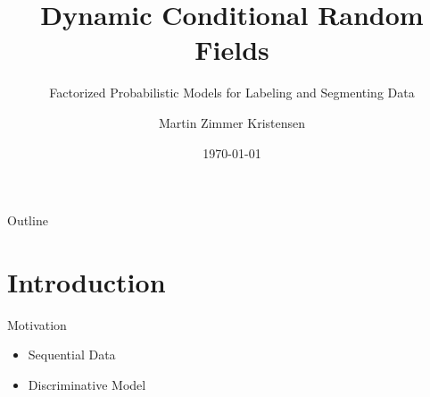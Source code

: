 \documentclass[presentation,bigger]{beamer}
\author{Martin Zimmer Kristensen}
\date{\today}
\title{Dynamic Conditional Random Fields}
\subtitle{Factorized Probabilistic Models for Labeling and Segmenting Data}
\begin{document}
\maketitle
\begin{frame}{Outline}
\setcounter{tocdepth}{1}
\tableofcontents
\end{frame}

\section{Introduction}
\label{sec:orgheadline10}
\begin{frame}[label={sec:orgheadline1}]{Motivation}
\begin{itemize}
\item Sequential Data
\item Discriminative Model
\end{itemize}
\end{frame}
\end{document}
